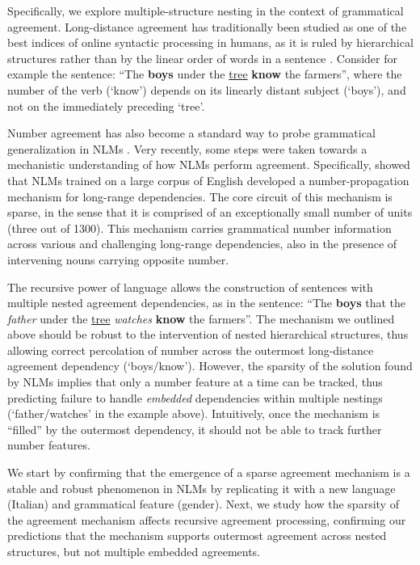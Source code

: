 Specifically, we explore multiple-structure nesting in the context of grammatical agreement. Long-distance agreement has traditionally been studied as one of the  best indices of online syntactic processing in humans, as it is ruled
by hierarchical structures rather than by the linear order of words in
a sentence \citep{Bock:Miller:1991, franck2002subject}. Consider for example the sentence: ``The \textbf{boys} under the \underline{tree} \textbf{know} the farmers'', where the number of the verb (`know') depends on its linearly distant subject (`boys'), and not on the immediately preceding `tree'.

Number agreement has also become a standard way to probe grammatical
generalization in NLMs \citep{Linzen:etal:2016,Bernardy:Lappin:2017,Giulianelli:etal:2018,Gulordava:etal:2018}. Very
recently, some steps were taken towards a mechanistic understanding of
how NLMs perform agreement. Specifically, \citet{lakretz2019emergence} showed that NLMs trained
on a large corpus of English developed a number-propagation mechanism for long-range dependencies. The core circuit of this mechanism is sparse, in the sense that it is comprised of an exceptionally small number of units (three out of 1300). This mechanism carries grammatical number information across various and challenging long-range dependencies, also in the presence of intervening nouns carrying opposite number.

The recursive power of language allows the construction of sentences with multiple nested agreement dependencies, as in the sentence: ``The \textbf{boys} that the \textit{father} under the \underline{tree} \textit{watches} \textbf{know} the farmers''. The mechanism we outlined above should be robust to the intervention of nested hierarchical structures, thus allowing correct percolation of number across the outermost long-distance agreement dependency (`boys/know'). However, the sparsity of the solution found by NLMs implies that only a number feature at a time can be tracked, thus predicting failure to handle \emph{embedded} dependencies within multiple nestings (`father/watches' in the example above). Intuitively, once the mechanism is ``filled'' by the outermost
dependency, it should not be able to track further number features.

We  start by confirming that the emergence of a sparse
agreement mechanism is a stable and robust phenomenon in NLMs by
replicating it with a new language (Italian) and grammatical feature
(gender). Next, we study how the sparsity of the agreement mechanism
affects recursive agreement processing, confirming our predictions
that the mechanism supports outermost agreement across nested
structures, but not multiple embedded agreements.

